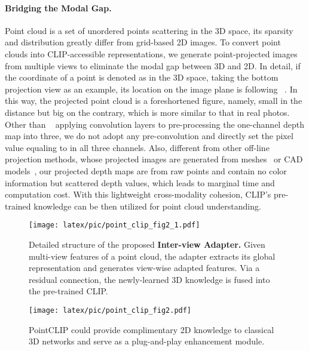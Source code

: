 \documentclass[10pt,twocolumn,letterpaper]{article}
\begin{document}
\vspace*{-8pt}
\paragraph{Bridging the Modal Gap.}
Point cloud is a set of unordered points scattering in the 3D space, its sparsity and distribution greatly differ from grid-based 2D images. To convert point clouds into CLIP-accessible representations, we generate point-projected images from multiple views to eliminate the modal gap between 3D and 2D. In detail, if the coordinate of a point is denoted as  in the 3D space, taking the bottom projection view as an example, its location on the image plane is  following ~\cite{goyal2021revisiting}. In this way, the projected point cloud is a foreshortened figure, namely, small in the distance but big on the contrary, which is more similar to that in real photos. Other than ~\cite{goyal2021revisiting} applying convolution layers to pre-processing the one-channel depth map into three, we do not adopt any pre-convolution and directly set the pixel value equaling to  in all three channels. Also, different from other off-line projection methods, whose projected images are generated from meshes~\cite{wang20183d} or CAD models~\cite{su2015multi}, our projected depth maps are from raw points and contain no color information but scattered depth values, which leads to marginal time and computation cost. With this lightweight cross-modality cohesion, CLIP's pre-trained knowledge can be then utilized for point cloud understanding.

\begin{figure*}[ht!]
\begin{minipage}[t]{0.63\textwidth}
\texttt{[image: latex/pic/point\_clip\_fig2\_1.pdf]}
\caption{Detailed structure of the proposed \textbf{Inter-view Adapter.} Given multi-view features of a point cloud, the adapter extracts its global representation and generates view-wise adapted features. Via a residual connection, the newly-learned 3D knowledge is fused into the pre-trained CLIP.}
\end{minipage}
\hspace{0.03in}
\begin{minipage}[t]{0.35\textwidth}

\texttt{[image: latex/pic/point\_clip\_fig2.pdf]}
\caption{PointCLIP could provide complimentary 2D knowledge to classical 3D networks and serve as a plug-and-play enhancement module.}
\end{minipage}
\vspace*{-15pt}
\end{figure*}
\end{document}
